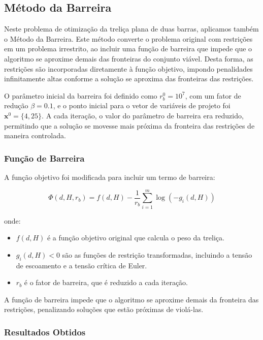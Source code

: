 \documentclass[a4paper, 12pt]{article}
\begin{document}
\subsection{Método da Barreira}

Neste problema de otimização da treliça plana de duas barras, aplicamos também o Método da Barreira. Este método converte o problema original com restrições em um problema irrestrito, ao incluir uma função de barreira que impede que o algoritmo se aproxime demais das fronteiras do conjunto viável. Desta forma, as restrições são incorporadas diretamente à função objetivo, impondo penalidades infinitamente altas conforme a solução se aproxima das fronteiras das restrições.

O parâmetro inicial da barreira foi definido como \( r_b^0 = 10^7 \), com um fator de redução \(\beta = 0.1\), e o ponto inicial para o vetor de variáveis de projeto foi \(\mathbf{x}^0 = \{4, 25\}\). A cada iteração, o valor do parâmetro de barreira era reduzido, permitindo que a solução se movesse mais próxima da fronteira das restrições de maneira controlada.

\subsubsection{Função de Barreira}

A função objetivo foi modificada para incluir um termo de barreira:

\begin{equation}
    \Phi(d, H, r_b) = f(d, H) - \frac{1}{r_b} \sum_{i=1}^{m} \log(-g_i(d, H))
\end{equation}

onde:
\begin{itemize}
    \item \( f(d, H) \) é a função objetivo original que calcula o peso da treliça.
    \item \( g_i(d, H) < 0 \) são as funções de restrição transformadas, incluindo a tensão de escoamento e a tensão crítica de Euler.
    \item \( r_b \) é o fator de barreira, que é reduzido a cada iteração.
\end{itemize}

A função de barreira impede que o algoritmo se aproxime demais da fronteira das restrições, penalizando soluções que estão próximas de violá-las.

\subsubsection{Resultados Obtidos}
\end{document}
